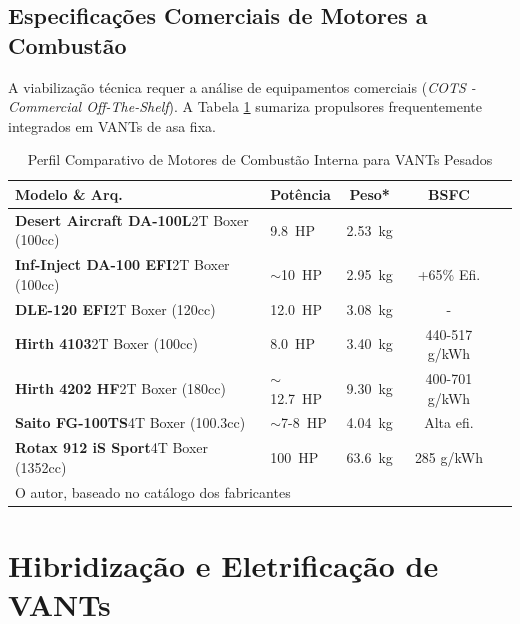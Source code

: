 \documentclass[a4paper,12pt]{article}
\begin{document}
\subsection{Especificações Comerciais de Motores a Combustão}

A viabilização técnica requer a análise de equipamentos comerciais (\textit{COTS - Commercial Off-The-Shelf}). A Tabela \ref{tab:motores_ice} sumariza propulsores frequentemente integrados em VANTs de asa fixa.

\begin{table}[H]
\centering
\caption{Perfil Comparativo de Motores de Combustão Interna para VANTs Pesados}
\label{tab:motores_ice}
\small
\begin{tabularx}{\textwidth}{@{}llccX@{}}
\toprule
\textbf{Modelo \& Arq.} & \textbf{Potência} & \textbf{Peso*} & \textbf{BSFC}  \\ \midrule
\textbf{Desert Aircraft DA-100L}\newline 2T Boxer (100cc) & \SI{9.8}{HP} & \SI{2.53}{kg}  \\
\textbf{Inf-Inject DA-100 EFI}\newline 2T Boxer (100cc) & $\sim$\SI{10}{HP} & \SI{2.95}{kg} & +65\% Efi.  \\
\textbf{DLE-120 EFI}\newline 2T Boxer (120cc) & \SI{12.0}{HP} & \SI{3.08}{kg} & - & \\
\textbf{Hirth 4103}\newline 2T Boxer (100cc) & \SI{8.0}{HP} & \SI{3.40}{kg} & 440-517 g/kWh  \\
\textbf{Hirth 4202 HF}\newline 2T Boxer (180cc) & $\sim$\SI{12.7}{HP} & \SI{9.30}{kg} & 400-701 g/kWh  \\
\textbf{Saito FG-100TS}\newline 4T Boxer (100.3cc) & $\sim$7-\SI{8}{HP} & \SI{4.04}{kg} & Alta efi.  \\
\textbf{Rotax 912 iS Sport}\newline 4T Boxer (1352cc) & \SI{100}{HP} & \SI{63.6}{kg} & 285 g/kWh &  \\ \bottomrule
\multicolumn{5}{l}{\footnotesize O autor, baseado no catálogo dos fabricantes}
\end{tabularx}
\end{table}

\section{Hibridização e Eletrificação de VANTs}
\end{document}
